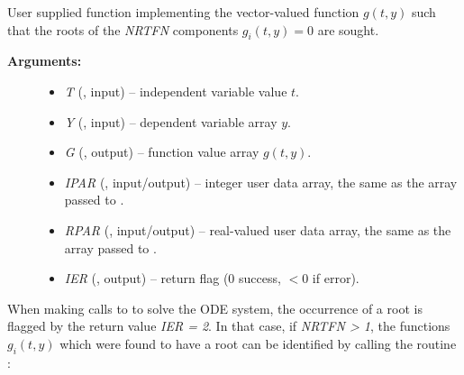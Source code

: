 \documentclass[letterpaper,10pt,english]{sphinxmanual}
\begin{document}
\begin{fulllineitems}
\label{f_interface/Rootfinding:f/_/FARKROOTFN}
User supplied function implementing the vector-valued function
$g(t,y)$ such that the roots of the \emph{NRTFN} components
$g_i(t,y)=0$ are sought.
\begin{description}
\item[{\textbf{Arguments:}}] \leavevmode\begin{itemize}
\item {} 
\emph{T} (, input) -- independent variable value $t$.

\item {} 
\emph{Y} (, input) -- dependent variable array $y$.

\item {} 
\emph{G} (, output) -- function value array $g(t,y)$.

\item {} 
\emph{IPAR} (, input/output) -- integer user data
array, the same as the array passed to {\hyperref[f_interface/Usage:f/_/FARKMALLOC]{}}.

\item {} 
\emph{RPAR} (, input/output) -- real-valued user data
array, the same as the array passed to {\hyperref[f_interface/Usage:f/_/FARKMALLOC]{}}.

\item {} 
\emph{IER}  (, output) -- return flag (0 success, $<0$
if error).

\end{itemize}

\end{description}

\end{fulllineitems}


When making calls to {\hyperref[f_interface/Usage:f/_/FARKODE]{}} to solve the ODE system, the
occurrence of a root is flagged by the return value \emph{IER = 2}.  In
that case, if \emph{NRTFN \textgreater{} 1}, the functions $g_i(t,y)$ which were
found to have a root can be identified by calling the routine
{\hyperref[f_interface/Rootfinding:f/_/FARKROOTINFO]{}}:
\end{document}
